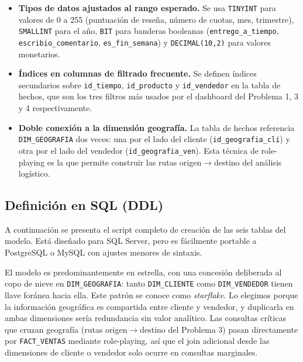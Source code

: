 \documentclass[11pt,a4paper]{article}
\begin{document}
\begin{itemize}[leftmargin=*, itemsep=2pt]
    \item \textbf{Tipos de datos ajustados al rango esperado.} Se usa \texttt{TINYINT} para valores de 0 a 255 (puntuación de reseña, número de cuotas, mes, trimestre), \texttt{SMALLINT} para el año, \texttt{BIT} para banderas booleanas (\texttt{entrego\_a\_tiempo}, \texttt{escribio\_comentario}, \texttt{es\_fin\_semana}) y \texttt{DECIMAL(10,2)} para valores monetarios.
    \item \textbf{Índices en columnas de filtrado frecuente.} Se definen índices secundarios sobre \texttt{id\_tiempo}, \texttt{id\_producto} y \texttt{id\_vendedor} en la tabla de hechos, que son los tres filtros más usados por el dashboard del Problema 1, 3 y 4 respectivamente.
    \item \textbf{Doble conexión a la dimensión geografía.} La tabla de hechos referencia \texttt{DIM\_GEOGRAFIA} dos veces: una por el lado del cliente (\texttt{id\_geografia\_cli}) y otra por el lado del vendedor (\texttt{id\_geografia\_ven}). Esta técnica de role-playing es la que permite construir las rutas origen$\to$destino del análisis logístico.
\end{itemize}

\subsection{Definición en SQL (DDL)}

A continuación se presenta el script completo de creación de las seis tablas del modelo. 
Está diseñado para SQL Server, pero es fácilmente portable a PostgreSQL o MySQL con 
ajustes menores de sintaxis.

El modelo es predominantemente en estrella, con una  concesión deliberada al copo de nieve en \texttt{DIM\_GEOGRAFIA}: tanto \texttt{DIM\_CLIENTE}  como \texttt{DIM\_VENDEDOR} tienen llave foránea hacia ella. Este patrón se conoce como  \emph{starflake}. Lo elegimos porque la información geográfica es compartida entre cliente  y vendedor, y duplicarla en ambas dimensiones sería redundancia sin valor analítico. Las  consultas críticas que cruzan geografía (rutas origen$\to$destino del Problema 3) pasan  directamente por \texttt{FACT\_VENTAS} mediante role-playing, así que el join adicional  desde las dimensiones de cliente o vendedor solo ocurre en consultas marginales.
\end{document}
